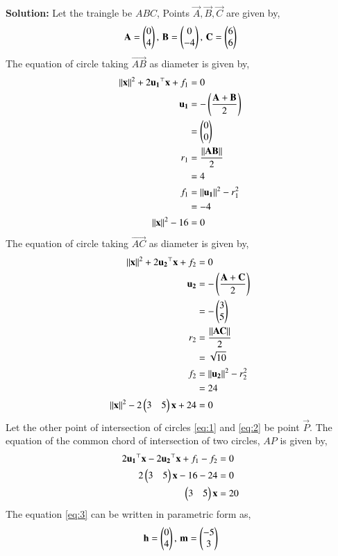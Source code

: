 \documentclass[journal,12pt,twocolumn]{IEEEtran}
\begin{document}
\begin{enumerate}
\textbf{Solution:}
Let the traingle be $ABC$, Points $\vec{A},\vec{B},\vec{C}$ are given by,
\begin{align}
\mathbf{A} = \begin{pmatrix}0\\4\end{pmatrix}, \,\mathbf{B} = \begin{pmatrix}0\\-4\end{pmatrix}, \,\mathbf{C} = \begin{pmatrix}6\\6\end{pmatrix}
\end{align}
The equation of circle taking $\vec{AB}$ as diameter is given by,
\begin{align}
\left\lVert\mathbf{x}\right\rVert^2 + 2\mathbf{u_1}^\top\mathbf{x} + f_1 &= 0 \\
\mathbf{u_1} &= -\left(\frac{\mathbf{A}+\mathbf{B}}{2}\right)\\
&= \begin{pmatrix}0\\0\end{pmatrix}\\
r_1 &= \frac{\left\lVert\mathbf{AB}\right\rVert}{2}\\
&= 4\\
f_1 &= \left\lVert\mathbf{u_1}\right\rVert^2 - r_1^2\\
&= -4\\
\left\lVert\mathbf{x}\right\rVert^2 -16 &= 0
\label{eq:1}
\end{align}
The equation of circle taking $\vec{AC}$ as diameter is given by,
\begin{align}
\left\lVert\mathbf{x}\right\rVert^2 + 2\mathbf{u_2}^\top\mathbf{x} + f_2 &= 0 \\
\mathbf{u_2} &= -\left(\frac{\mathbf{A}+\mathbf{C}}{2}\right)\\
&= -\begin{pmatrix}3\\5\end{pmatrix}\\
r_2 &= \frac{\left\lVert\mathbf{AC}\right\rVert}{2}\\
&= \sqrt{10}\\
f_2 &= \left\lVert\mathbf{u_2}\right\rVert^2 - r_2^2\\
&= 24\\
\left\lVert\mathbf{x}\right\rVert^2 -2\begin{pmatrix}3&5\end{pmatrix}\mathbf{x}+24 &= 0
\label{eq:2}
\end{align}
Let the other point of intersection of circles \eqref{eq:1} and \eqref{eq:2} be point $\vec{P}$. The equation of the common chord of intersection of two circles, $AP$ is given by,
\begin{align}
2\mathbf{u_1}^\top\mathbf{x}-2\mathbf{u_2}^\top\mathbf{x}+f_1 - f_2 &= 0\\
2\begin{pmatrix}3 & 5\end{pmatrix}\mathbf{x}-16-24&= 0\\
\begin{pmatrix}3&5\end{pmatrix}\mathbf{x} &= 20
\label{eq:3}
\end{align}
The equation \eqref{eq:3} can be written in parametric form as,
\begin{align}
\vec{h} = \myvec{0\\4}, \, \vec{m} = \myvec{-5\\3}\\

\end{align}
\end{enumerate}
\end{document}

